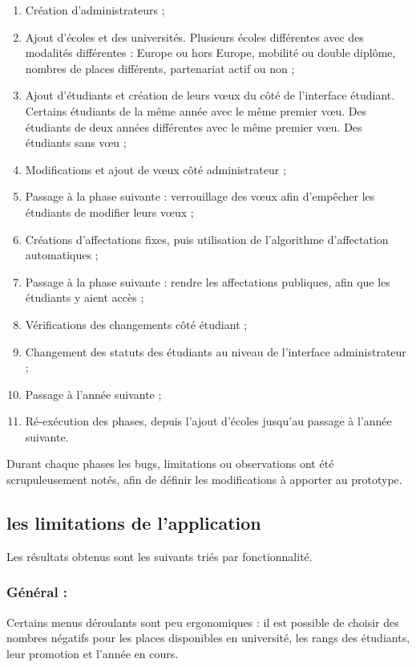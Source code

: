 \begin{enumerate}
\item Création d'administrateurs ;
\item Ajout d'écoles et des universités. Plusieurs écoles différentes avec des modalités différentes : Europe ou hors Europe, mobilité ou double diplôme, nombres de places différents, partenariat actif ou non ;
\item Ajout d'étudiants et création de leurs vœux du côté de l'interface étudiant. Certains étudiants de la même année avec le même premier vœu. Des étudiants de deux années différentes avec le même premier vœu. Des étudiants sans vœu ;
\item Modifications et ajout de vœux côté administrateur ;
\item Passage à la phase suivante : verrouillage des vœux afin d'empêcher les étudiants de modifier leurs vœux ;
\item Créations d'affectations fixes, puis utilisation de l'algorithme d'affectation automatiques ;
\item Passage à la phase suivante : rendre les affectations publiques, afin que les étudiants y aient accès ;
\item Vérifications des changements côté étudiant ;
\item Changement des statuts des étudiants au niveau de l'interface administrateur ;
\item Passage à l'année suivante ;
\item Ré-exécution des phases, depuis l'ajout d'écoles jusqu'au passage à l'année suivante.
\end{enumerate}


Durant chaque phases les bugs, limitations ou observations ont été scrupuleusement notés, afin de définir les modifications à apporter au prototype.


\subsection{les limitations de l'application}

Les résultats obtenus sont les suivants triés par fonctionnalité.

\subsubsection{Général :}
Certains menus déroulants sont peu ergonomiques : il est possible de choisir des nombres négatifs pour les places disponibles en université, les rangs des étudiants, leur promotion et l'année en cours.

